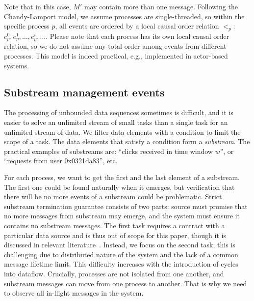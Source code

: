 Note that in this case, $M'$ may contain more than one message. Following the Chandy-Lamport model, we assume processes are single-threaded, so within the specific process $p$, all events are ordered by a local causal order relation $<_p$: $e^{0}_p,e^{1}_p,\ldots,e^{i}_p,\ldots$. Please note that each process has its own local causal order relation, so we do not assume any total order among events from different processes. This model is indeed practical, e.g., implemented in actor-based systems.


\subsection{Substream management events}
The processing of unbounded data sequences sometimes is difficult, and it is easier to solve an unlimited stream of small tasks than a single task for an unlimited stream of data. We filter data elements with a condition to limit the scope of a task. The data elements that satisfy a condition form a {\em substream}. The practical examples of substreams are: ``clicks received in time window $w$'', or ``requests from user 0x0321da83'', etc.

For each process, we want to get the first and the last element of a substream. The first one could be found naturally when it emerges, but verification that there will be no more events of a substream could be problematic. Strict substream termination guarantee consists of two parts: source must promise that no more messages from substream may emerge, and the system must ensure it contains no substream messages. The first task requires a contract with a particular data source and is thus out of scope for this paper, though it is discussed in relevant literature~\cite{awad2019adaptive}. Instead, we focus on the second task; this is challenging due to distributed nature of the system and the lack of a common message lifetime limit. This difficulty increases with the introduction of cycles into dataflow. Crucially, processes are not isolated from one another, and substream messages can move from one process to another. That is why we need to observe all in-flight messages in the system.

